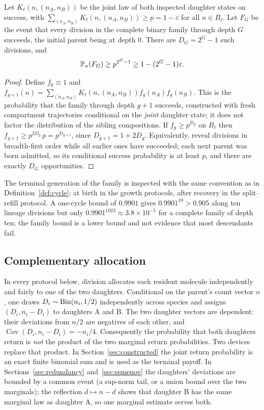 \begin{proposition}\label{prop:family}
Let $K_\ell(n,(n_A,n_B))$ be the joint law of both inspected daughter states on success, with $\sum_{(n_A,n_B)}K_\ell(n,(n_A,n_B))\ge p=1-\varepsilon$ for all $n\in B_\ell$. Let $F_G$ be the event that every division in the complete binary family through depth $G$ succeeds, the initial parent being at depth $0$. There are $D_G=2^G-1$ such divisions, and
\[
 \mathbb P_n(F_G)\ge p^{2^G-1}\ge1-(2^G-1)\varepsilon .
\]
\end{proposition}
\begin{proof}
Define $f_0\equiv1$ and $f_{g+1}(n)=\sum_{(n_A,n_B)}K_\ell(n,(n_A,n_B))f_g(n_A)f_g(n_B)$. This is the probability that the family through depth $g+1$ succeeds, constructed with fresh compartment trajectories conditional on the \emph{joint} daughter state; it does not factor the distribution of the sibling compositions. If $f_g\ge p^{D_g}$ on $B_\ell$ then $f_{g+1}\ge p^{2D_g}\,p=p^{D_{g+1}}$, since $D_{g+1}=1+2D_g$. Equivalently, reveal divisions in breadth-first order while all earlier ones have succeeded; each next parent was born admitted, so its conditional success probability is at least $p$, and there are exactly $D_G$ opportunities.
\end{proof}

The terminal generation of the family is inspected with the same convention as in Definition~\ref{def:cycle}: at birth in the growth protocols, after recovery in the split--refill protocol. A one-cycle bound of $0.9901$ gives $0.9901^{10}>0.905$ along ten lineage divisions but only $0.9901^{1023}\approx3.8\times10^{-5}$ for a complete family of depth ten; the family bound is a lower bound and not evidence that most descendants fail.

\subsection{Complementary allocation}\label{sec:partition}
In every protocol below, division allocates each resident molecule independently and fairly to one of the two daughters. Conditional on the parent's count vector $n$, one draws $D_i\sim\operatorname{Bin}(n_i,1/2)$ independently across species and assigns $(D_i,n_i-D_i)$ to daughters A and B. The two daughter vectors are dependent: their deviations from $n/2$ are negatives of each other, and $\operatorname{Cov}(D_i,n_i-D_i)=-n_i/4$. Consequently the probability that both daughters return is \emph{not} the product of the two marginal return probabilities. Two devices replace that product. In Section~\ref{sec:constructed} the joint return probability is an exact finite binomial sum and is used as the terminal payoff. In Sections~\ref{sec:redundancy} and~\ref{sec:semenov} the daughters' deviations are bounded by a common event (a sup-norm tail, or a union bound over the two marginals); the reflection $d\mapsto n-d$ shows that daughter B has the same marginal law as daughter A, so one marginal estimate serves both.

